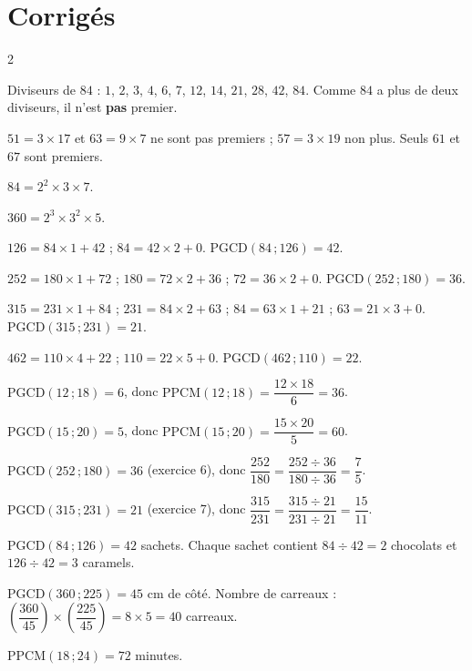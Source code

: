 \section{Corrigés}
\begin{multicols}{2}

Diviseurs de $84$ : $1$, $2$, $3$, $4$, $6$, $7$, $12$, $14$, $21$, $28$, $42$, $84$. Comme
$84$ a plus de deux diviseurs,
il n'est \textbf{pas} premier.

$51=3\times17$ et $63=9\times7$ ne sont pas premiers ; $57=3\times19$ non plus. Seuls
$61$ et $67$ sont premiers.

$84=2^{2}\times3\times7$.

$360=2^{3}\times3^{2}\times5$.

$126=84\times1+42$ ; $84=42\times2+0$. $\text{PGCD}(84\,;126)=42$.

$252=180\times1+72$ ; $180=72\times2+36$ ; $72=36\times2+0$.
$\text{PGCD}(252\,;180)=36$.

$315=231\times1+84$ ; $231=84\times2+63$ ; $84=63\times1+21$ ; $63=21\times3+0$.
$\text{PGCD}(315\,;231)=21$.

$462=110\times4+22$ ; $110=22\times5+0$. $\text{PGCD}(462\,;110)=22$.

$\text{PGCD}(12\,;18)=6$, donc $\text{PPCM}(12\,;18)=\dfrac{12\times18}6=36$.

$\text{PGCD}(15\,;20)=5$, donc $\text{PPCM}(15\,;20)=\dfrac{15\times20}5=60$.

$\text{PGCD}(252\,;180)=36$ (exercice 6), donc
$\dfrac{252}{180}=\dfrac{252\div36}{180\div36}=\dfrac75$.

$\text{PGCD}(315\,;231)=21$ (exercice 7), donc
$\dfrac{315}{231}=\dfrac{315\div21}{231\div21}=\dfrac{15}{11}$.

$\text{PGCD}(84\,;126)=42$ sachets. Chaque sachet contient $84\div42=2$ chocolats et
$126\div42=3$ caramels.

$\text{PGCD}(360\,;225)=45$ cm de côté. Nombre de carreaux :
$\left(\dfrac{360}{45}\right)\times\left(\dfrac{225}{45}\right)=8\times5=40$ carreaux.

$\text{PPCM}(18\,;24)=72$ minutes.


\end{multicols}

